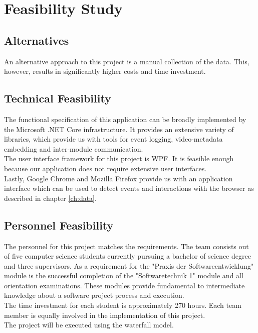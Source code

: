 \chapter{Feasibility Study}
\label{ch:feasibility}

\section{Alternatives}
\label{Alternatives}
An alternative approach to this project is a manual collection of the data. This, however, results in significantly higher costs and time investment.

\section{Technical Feasibility}
\label{Technical Feasibility}
The functional specification of this application can be broadly implemented by the Microsoft .NET Core infrastructure. It provides an extensive variety of libraries, which provide us with tools for \gls{event} logging, video-metadata embedding and inter-module communication.\\
The user interface framework for this project is WPF. It is feasible enough because our application does not require extensive user interfaces.\\
Lastly, Google Chrome and Mozilla Firefox provide us with an application interface which can be used to detect \glspl{event} and interactions with the \gls{browser} as described in chapter \ref{ch:data}.

\section{Personnel Feasibility}
\label{Personnel Feasibility}
The personnel for this project matches the requirements. The team consists out of five computer science students currently pursuing a bachelor of science degree and three supervisors. As a requirement for the "Praxis der Softwareentwicklung" module is the successful completion of the "Softwaretechnik 1" module and all orientation examinations. These modules provide fundamental to intermediate knowledge about a software project process and execution.\\
The time investment for each student is approximately 270 hours. Each team member is equally involved in the implementation of this project.\\
The project will be executed using the waterfall model.

